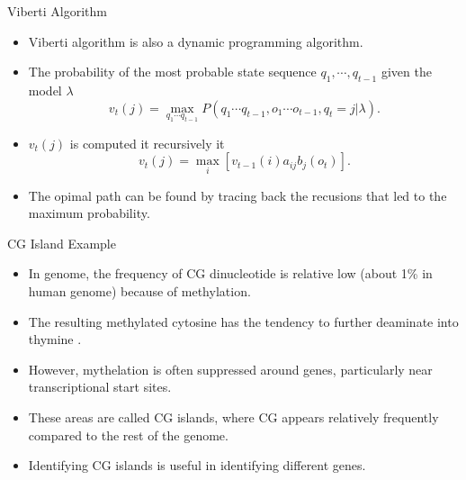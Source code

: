 \documentclass{beamer}
\begin{document}
\begin{frame}{Viberti Algorithm}
	\begin{itemize}
		\item Viberti algorithm is also a dynamic programming algorithm.
		\item The probability of the most probable state sequence $q_1, \cdots, q_{t-1}$ given the model $\lambda$
		\begin{equation}
			v_t(j) = \max_{q_1\cdots q_{t-1}} P(q_1\cdots q_{t-1}, o_1\cdots o_{t-1}, q_t = j \vert \lambda).
		\end{equation}
		\item $v_t(j)$ is computed it recursively it 
		\begin{equation}
			v_t(j) = \max_i[v_{t-1}(i) a_{ij} b_j(o_t)].
		\end{equation}
		\item The opimal path can be found by tracing back the recusions that led to the maximum probability.
	\end{itemize}
\end{frame}


\begin{frame}{CG Island Example}
	\begin{itemize}
		\item In genome, the frequency of CG dinucleotide is relative low (about 1\% in human genome) because of methylation. 
		\item The resulting methylated cytosine has the tendency to further deaminate into thymine \cite{compeau2018bioinformatics}.
		\item However, mythelation is often suppressed around genes, particularly near transcriptional start sites.
		\item These areas are called CG islands, where CG appears relatively frequently compared to the rest of the genome.
		\item Identifying CG islands is useful in identifying different genes.
	\end{itemize}
\end{frame}
\end{document}
